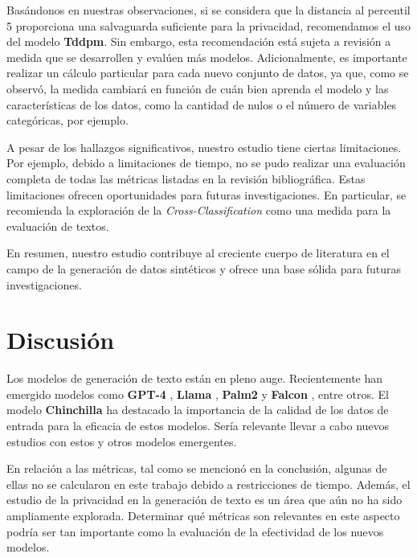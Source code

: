 Basándonos en nuestras observaciones, si se considera que la distancia al percentil 5 proporciona una salvaguarda suficiente para la privacidad, recomendamos el uso del modelo \textbf{Tddpm}. Sin embargo, esta recomendación está sujeta a revisión a medida que se desarrollen y evalúen más modelos. Adicionalmente, es importante realizar un cálculo particular para cada nuevo conjunto de datos, ya que, como se observó, la medida cambiará en función de cuán bien aprenda el modelo y las características de los datos, como la cantidad de nulos o el número de variables categóricas, por ejemplo.

A pesar de los hallazgos significativos, nuestro estudio tiene ciertas limitaciones. Por ejemplo, debido a limitaciones de tiempo, no se pudo realizar una evaluación completa de todas las métricas listadas en la revisión bibliográfica. Estas limitaciones ofrecen oportunidades para futuras investigaciones. En particular, se recomienda la exploración de la \emph{Cross-Classification} como una medida para la evaluación de textos.

En resumen, nuestro estudio contribuye al creciente cuerpo de literatura en el campo de la generación de datos sintéticos y ofrece una base sólida para futuras investigaciones.

\section{Discusión}
Los modelos de generación de texto están en pleno auge. Recientemente han emergido modelos como \textbf{GPT-4} \cite{openai_gpt-4_2023}, \textbf{Llama} \cite{noauthor_llama_nodate}, \textbf{Palm2} \cite{anil_palm_2023} y \textbf{Falcon} \cite{noauthor_falcon_nodate}, entre otros. El modelo \textbf{Chinchilla} \cite{hoffmann_training_2022} ha destacado la importancia de la calidad de los datos de entrada para la eficacia de estos modelos. Sería relevante llevar a cabo nuevos estudios con estos y otros modelos emergentes.

En relación a las métricas, tal como se mencionó en la conclusión, algunas de ellas no se calcularon en este trabajo debido a restricciones de tiempo. Además, el estudio de la privacidad en la generación de texto es un área que aún no ha sido ampliamente explorada. Determinar qué métricas son relevantes en este aspecto podría ser tan importante como la evaluación de la efectividad de los nuevos modelos.
